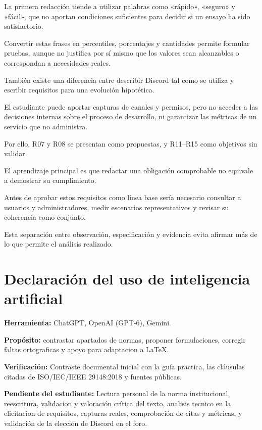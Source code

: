 \documentclass[12pt,a4paper]{article}
\begin{document}
La primera redacción tiende a utilizar palabras como «rápido», «seguro» y «fácil», que no aportan condiciones suficientes para decidir si un ensayo ha sido satisfactorio.

Convertir estas frases en percentiles, porcentajes y cantidades permite formular pruebas, aunque no justifica por sí mismo que los valores sean alcanzables o correspondan a necesidades reales.

También existe una diferencia entre describir Discord tal como se utiliza y escribir requisitos para una evolución hipotética.

El estudiante puede aportar capturas de canales y permisos, pero no acceder a las decisiones internas sobre el proceso de desarrollo, ni garantizar las métricas de un servicio que no administra.

Por ello, R07 y R08 se presentan como propuestas, y R11--R15 como objetivos sin validar.

El aprendizaje principal es que redactar una obligación comprobable no equivale a demostrar su cumplimiento.

Antes de aprobar estos requisitos como línea base sería necesario consultar a usuarios y administradores, medir escenarios representativos y revisar su coherencia como conjunto.

Esta separación entre observación, especificación y evidencia evita afirmar más de lo que permite el análisis realizado.


\vspace{2.2cm}
\section*{Declaración del uso de inteligencia artificial}

\textbf{Herramienta:}
ChatGPT, OpenAI (GPT-6), Gemini.

\textbf{Propósito:}
contrastar apartados de normas, proponer formulaciones, corregir faltas ortograficas y apoyo para adaptacion a LaTeX.

\textbf{Verificación:}
Contraste documental inicial con la guía practica, las cláusulas citadas de ISO/IEC/IEEE 29148:2018 y fuentes públicas.

\textbf{Pendiente del estudiante:}
Lectura personal de la norma institucional, reescritura, validacion y valoración crítica del texto, analisis tecnico en la elicitacion de requisitos, capturas reales, comprobación de citas y métricas, y validación de la elección de Discord en el foro.




\end{document}
